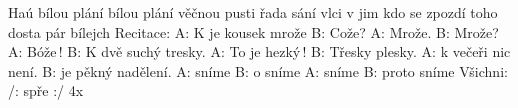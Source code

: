 \begin{TEXT}{Haú bílou plání}
\REFREN  {} bílou plání věčnou pusti \NL
{} řada sání vlci v  jim   \NL
{} kdo se zpozdí toho dosta \NL
{} pár bílejch    
\INTERM Recitace: \NL
A: K  je kousek mrože \NL
B: Cože? \NL
A: Mrože. \NL
B: Mrože? \NL
A: Bóže\,! \NL
B: K  dvě suchý tresky. \NL
A: To je hezký\,! \NL
B: Třesky plesky. \NL
A:  k večeři nic není. \NL
B:  je pěkný nadělení. \NL
A:  sníme \NL
B: o sníme \NL
A:  sníme \NL
B: proto sníme \NL
Všichni: /:  spře :/           4x \NL
\end{TEXT}
